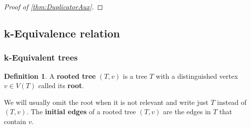 \documentclass[12pt,notitlepage,a4paper]{article}
\theoremstyle{definition}
\newtheorem{definition}{Definition}[section]
\begin{document}
\begin{proof}[Proof of \cref{thm:DuplicatorAux}]
%		
%	
\end{proof}



\subsection{k-Equivalence relation}


\subsubsection{k-Equivalent trees} \label{sect:equivtrees}

\begin{definition}
	 A \textbf{rooted tree} $(T,v)$ is a tree $T$ with a 
	distinguished vertex $v\in V(T)$ called its \textbf{root}.
\end{definition}
We will usually omit the root when it is not relevant and 
write just $T$ instead of $(T,v)$. The
\textbf{initial edges} of a rooted tree $(T,v)$ are 
the edges in $T$ that contain $v$. \par
\end{document}
